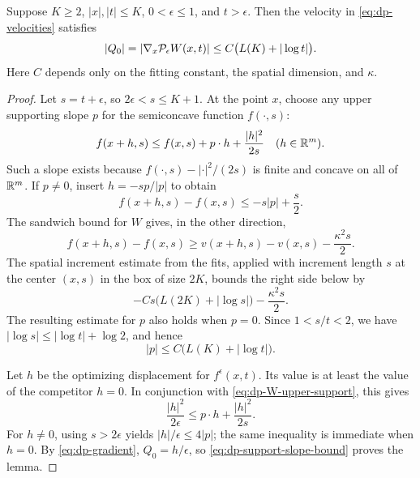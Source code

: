 \begin{lemma}\label{lem:dp-log-velocity}
Suppose $K\ge2$, $|x|,|t|\le K$, $0<\epsilon\le1$, and $t>\epsilon$.
Then the velocity in \eqref{eq:dp-velocities} satisfies
\begin{equation}\label{eq:dp-log-velocity}
  |Q_0|=|\nabla_x\mathcal{P}_\epsilon W(x,t)|
       \le C\bigl(L(K)+|\log t|\bigr).
\end{equation}
Here $C$ depends only on the fitting constant, the spatial dimension, and
$\kappa$.
\end{lemma}

\begin{proof}
Let $s=t+\epsilon$, so $2\epsilon<s\le K+1$.  At the point $x$, choose any
upper supporting slope $p$ for the semiconcave function $f(\cdot,s)$:
\begin{equation}\label{eq:dp-W-upper-support}
  f(x+h,s)\le f(x,s)+p\cdot h+\frac{|h|^2}{2s}
  \quad(h\in\mathbb{R}^m).
\end{equation}
Such a slope exists because $f(\cdot,s)-|\cdot|^2/(2s)$ is finite and
concave on all of $\mathbb{R}^m$.  If $p\ne0$, insert $h=-sp/|p|$ to obtain
\[
  f(x+h,s)-f(x,s)\le-s|p|+\frac{s}{2}.
\]
The sandwich bound for $W$ gives, in the other direction,
\[
  f(x+h,s)-f(x,s)
    \ge v(x+h,s)-v(x,s)-\frac{\kappa^2s}{2}.
\]
The spatial increment estimate from the fits, applied with increment length
$s$ at the center $(x,s)$ in the box of size $2K$, bounds the right side
below by
\[
  -Cs\bigl(L(2K)+|\log s|\bigr)-\frac{\kappa^2s}{2}.
\]
The resulting estimate for $p$ also holds when $p=0$.  Since
$1<s/t<2$, we have $|\log s|\le|\log t|+\log2$, and hence
\begin{equation}\label{eq:dp-support-slope-bound}
  |p|\le C\bigl(L(K)+|\log t|\bigr).
\end{equation}

Let $h$ be the optimizing displacement for $f^\epsilon(x,t)$.  Its value
is at least the value of the competitor $h=0$.  In conjunction with
\eqref{eq:dp-W-upper-support}, this gives
\[
  \frac{|h|^2}{2\epsilon}\le p\cdot h+\frac{|h|^2}{2s}.
\]
For $h\ne0$, using $s>2\epsilon$ yields $|h|/\epsilon\le4|p|$; the same
inequality is immediate when $h=0$.  By \eqref{eq:dp-gradient},
$Q_0=h/\epsilon$, so \eqref{eq:dp-support-slope-bound} proves the lemma.
\end{proof}
